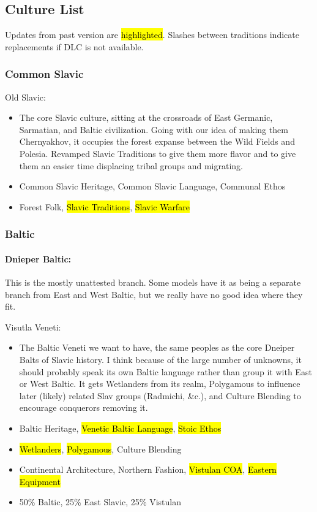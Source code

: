 \documentclass{article}
\begin{document}
	\subsection{Culture List}
	Updates from past version are \hl{highlighted}.
	Slashes between traditions indicate replacements if DLC is not available.
	
	\subsubsection{Common Slavic}
	
	Old Slavic:
	\begin{itemize}
		\item The core Slavic culture, sitting at the crossroads of East Germanic, Sarmatian, and Baltic civilization. Going with our idea of making them Chernyakhov, it occupies the forest expanse between the Wild Fields and Polesia.
		\newline
		Revamped Slavic Traditions to give them more flavor and to give them an easier time displacing tribal groups and migrating.
		\item Common Slavic Heritage, Common Slavic Language, Communal Ethos
		\item Forest Folk, \hl{Slavic Traditions}, \hl{Slavic Warfare}
	\end{itemize}
	
	\subsubsection{Baltic}
	
	\paragraph{Dnieper Baltic:}
	This is the mostly unattested branch.
	Some models have it as being a separate branch from East and West Baltic, but we really have no good idea where they fit.
	
	Visutla Veneti:
	\begin{itemize}
		\item The Baltic Veneti we want to have, the same peoples as the core Dneiper Balts of Slavic history. I think because of the large number of unknowns, it should probably speak its own Baltic language rather than group it with East or West Baltic. It gets Wetlanders from its realm, Polygamous to influence later (likely) related Slav groups (Radmichi, \&c.), and Culture Blending to encourage conquerors removing it.
		\item Baltic Heritage, \hl{Venetic Baltic Language}, \hl{Stoic Ethos}
		\item \hl{Wetlanders}, \hl{Polygamous}, Culture Blending
		\item Continental Architecture, Northern Fashion, \hl{Vistulan COA}, \hl{Eastern Equipment}
		\item 50\% Baltic, 25\% East Slavic, 25\% Vistulan
	\end{itemize}
	
\end{document}

